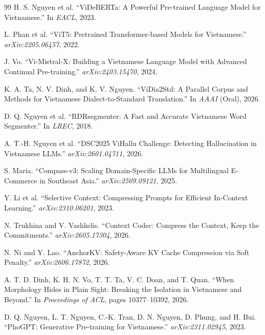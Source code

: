 \documentclass[12pt,a4paper]{article}
\begin{document}
\begin{thebibliography}{99}
H. S. Nguyen et al.
\newblock ``ViDeBERTa: A Powerful Pre-trained Language Model for Vietnamese.''
\newblock In \emph{EACL}, 2023.

L. Phan et al.
\newblock ``ViT5: Pretrained Transformer-based Models for Vietnamese.''
\newblock \emph{arXiv:2205.06457}, 2022.

J. Vo.
\newblock ``Vi-Mistral-X: Building a Vietnamese Language Model with Advanced Continual Pre-training.''
\newblock \emph{arXiv:2403.15470}, 2024.

K. A. Ta, N. V. Dinh, and K. V. Nguyen.
\newblock ``ViDia2Std: A Parallel Corpus and Methods for Vietnamese Dialect-to-Standard Translation.''
\newblock In \emph{AAAI} (Oral), 2026.

D. Q. Nguyen et al.
\newblock ``RDRsegmenter: A Fast and Accurate Vietnamese Word Segmenter.''
\newblock In \emph{LREC}, 2018.

A. T.-H. Nguyen et al.
\newblock ``DSC2025 ViHallu Challenge: Detecting Hallucination in Vietnamese LLMs.''
\newblock \emph{arXiv:2601.04711}, 2026.

S. Maria.
\newblock ``Compass-v3: Scaling Domain-Specific LLMs for Multilingual E-Commerce in Southeast Asia.''
\newblock \emph{arXiv:2509.09121}, 2025.

Y. Li et al.
\newblock ``Selective Context: Compressing Prompts for Efficient In-Context Learning.''
\newblock \emph{arXiv:2310.06201}, 2023.

N. Trukhina and V. Vashkelis.
\newblock ``Context Codec: Compress the Context, Keep the Commitments.''
\newblock \emph{arXiv:2605.17304}, 2026.

N. Ni and Y. Lao.
\newblock ``AnchorKV: Safety-Aware KV Cache Compression via Soft Penalty.''
\newblock \emph{arXiv:2606.17872}, 2026.


A. T. D. Dinh, K. H. N. Vo, T. T. Ta, V. C. Doan, and T. Quan.
\newblock ``When Morphology Hides in Plain Sight: Breaking the Isolation in Vietnamese and Beyond.''
\newblock In \emph{Proceedings of ACL}, pages 10377--10392, 2026.

D. Q. Nguyen, L. T. Nguyen, C.-K. Tran, D. N. Nguyen, D. Phung, and H. Bui.
\newblock ``PhoGPT: Generative Pre-training for Vietnamese.''
\newblock \emph{arXiv:2311.02945}, 2023.


\end{thebibliography}
\end{document}

